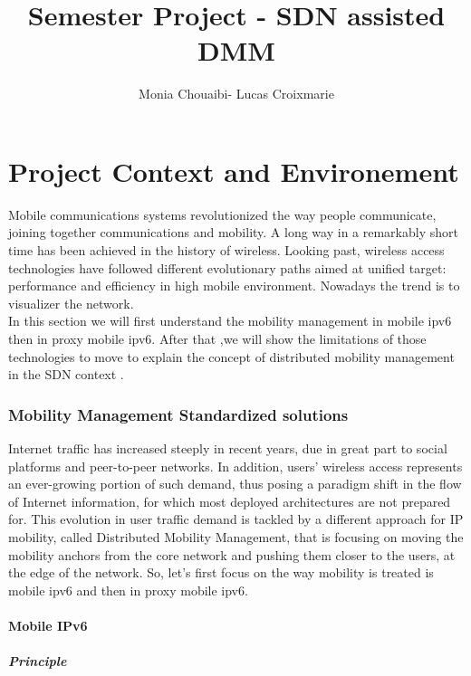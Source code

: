 \documentclass{article}
\title{Semester Project - SDN assisted DMM }
\author{Monia Chouaibi- Lucas Croixmarie}
\begin{document}
\maketitle
\newpage
\tableofcontents
\newpage
\part{Project Context and Environement}

Mobile communications systems revolutionized the way people
communicate, joining together communications and mobility. A long way
in a remarkably short time has been achieved in the history of
wireless.  Looking past, wireless access technologies have followed
different evolutionary paths aimed at unified target: performance and
efficiency in high mobile environment. Nowadays the trend is to
visualizer the network.\\
\newline
In this section we will first understand the mobility management in
mobile ipv6 then in proxy mobile ipv6. After that ,we will show the
limitations of those technologies to move to explain the concept of
distributed mobility management in the SDN context .


\section{Mobility Management Standardized solutions}

Internet traffic has increased steeply in recent years, due in great
part to social platforms and peer-to-peer networks. In addition,
users' wireless access represents an ever-growing portion of such
demand, thus posing a paradigm shift in the flow of Internet
information, for which most deployed architectures are not prepared
for. This evolution in user traffic demand is tackled by a different
approach for IP mobility, called Distributed Mobility Management, that
is focusing on moving the mobility anchors from the core network and
pushing them closer to the users, at the edge of the network. So,
let's first focus on the way mobility is treated is mobile ipv6 and
then in proxy mobile ipv6.

\subsection{Mobile IPv6}

\subsubsection{Principle}
\end{document}
